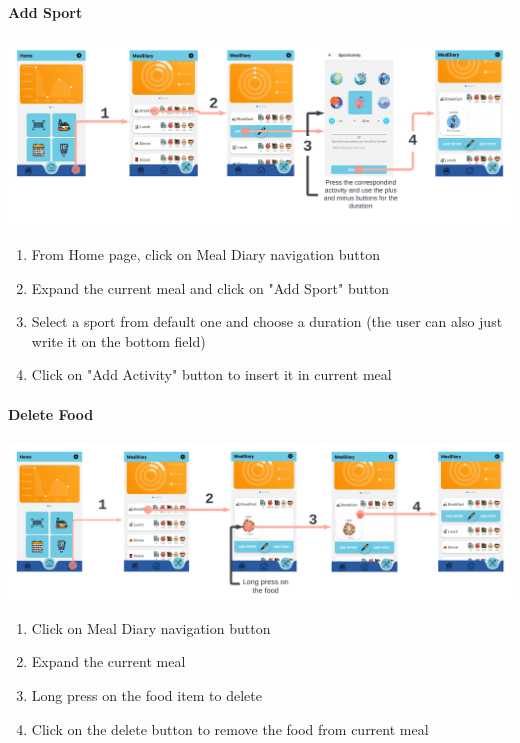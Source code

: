 \documentclass[12pt,hidelinks]{article}
\begin{document}
  \newpage

\paragraph{Add Sport}
\begin{center}
	\includegraphics[scale=0.117]{Sport}
\end{center}

\begin{enumerate}
	\item From Home page, click on Meal Diary navigation button
	\item Expand the current meal and click on "Add Sport" button
	\item Select a sport from default one and choose a duration (the user can also just write it on the bottom field)
 	\item Click on "Add Activity" button to insert it in current meal
  \end{enumerate}

\paragraph{Delete Food}

\begin{center}
	\includegraphics[scale=0.112]{Delete Food}
\end{center}
\begin{enumerate}
	\item Click on Meal Diary navigation button
    \item Expand the current meal
	\item Long press on the food item to delete
 	\item Click on the delete button to remove the food from current meal
  \end{enumerate}
\end{document}
